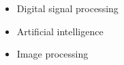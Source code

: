 \begin{itemize}
	\item Digital signal processing
	\item Artificial intelligence
	\item Image processing
	      \\
\end{itemize}

